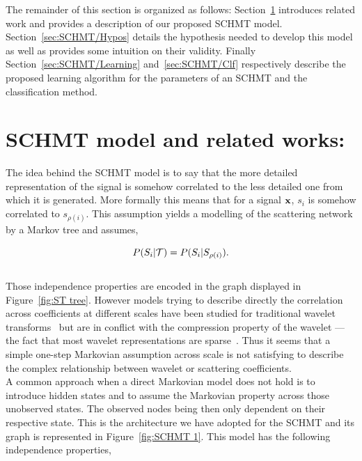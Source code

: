 \documentclass[a4paper,11pt]{report}
\begin{document}
  The remainder of this section is organized as follows: Section~\ref{sec:SCHMT/Rel work} introduces related work and provides a description of our proposed SCHMT model. Section~\ref{sec:SCHMT/Hypos} details the hypothesis needed to develop this model as well as provides some intuition on their validity. Finally Section~\ref{sec:SCHMT/Learning} and~\ref{sec:SCHMT/Clf} respectively describe the proposed learning algorithm for the parameters of an SCHMT and the classification method.

  
  \section{SCHMT model and related works:}
    \label{sec:SCHMT/Rel work}
      
    The idea behind the SCHMT model is to say that the more detailed representation of the signal is somehow correlated to the less detailed one from which it is generated. More formally this means that for a signal ${\bf x}$, $s_{i}$ is somehow correlated to $s_{\rho(i)}$. This assumption yields a modelling of the scattering network by a Markov tree and assumes,
    
    \begin{equation}
      P(S_{i} |\mathcal{T}) = P(S_{i} | S_{\rho(i)}).
      \label{eq:SMT - false hypo}
    \end{equation}\\

    Those independence properties are encoded in the graph displayed in Figure~\ref{fig:ST tree}. However models trying to describe directly the correlation across coefficients at different scales have been studied for traditional wavelet transforms~\citep{lee1996new} but are in conflict with the compression property of the wavelet ---\ie the fact that most wavelet representations are sparse~\citep{crouse1998wavelet}. Thus it seems that a simple one-step Markovian assumption across scale is not satisfying to describe the complex relationship between wavelet or scattering coefficients.\\
    
    A common approach when a direct Markovian model does not hold is to introduce hidden states and to assume the Markovian property across those unobserved states. The observed nodes being then only dependent on their respective state. This is the architecture we have adopted for the SCHMT and its graph is represented in Figure~\ref{fig:SCHMT 1}. This model has the following independence properties,
    
\end{document}
